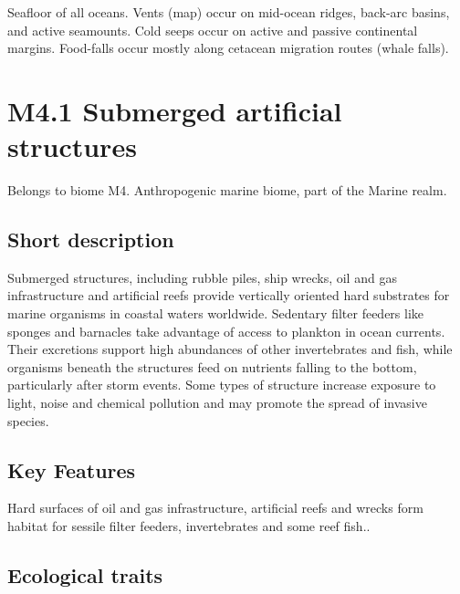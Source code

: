 \documentclass[
  letterpaper,
  DIV=11,
  numbers=noendperiod]{scrartcl}
\begin{document}
Seafloor of all oceans. Vents (map) occur on mid-ocean ridges, back-arc
basins, and active seamounts. Cold seeps occur on active and passive
continental margins. Food-falls occur mostly along cetacean migration
routes (whale falls).

\section{M4.1 Submerged artificial
structures}\label{m4.1-submerged-artificial-structures}

Belongs to biome M4. Anthropogenic marine biome, part of the Marine
realm.

\subsection{Short description}\label{short-description-47}

Submerged structures, including rubble piles, ship wrecks, oil and gas
infrastructure and artificial reefs provide vertically oriented hard
substrates for marine organisms in coastal waters worldwide. Sedentary
filter feeders like sponges and barnacles take advantage of access to
plankton in ocean currents. Their excretions support high abundances of
other invertebrates and fish, while organisms beneath the structures
feed on nutrients falling to the bottom, particularly after storm
events. Some types of structure increase exposure to light, noise and
chemical pollution and may promote the spread of invasive species.

\subsection{Key Features}\label{key-features-47}

Hard surfaces of oil and gas infrastructure, artificial reefs and wrecks
form habitat for sessile filter feeders, invertebrates and some reef
fish..

\subsection{Ecological traits}\label{ecological-traits-47}
\end{document}
